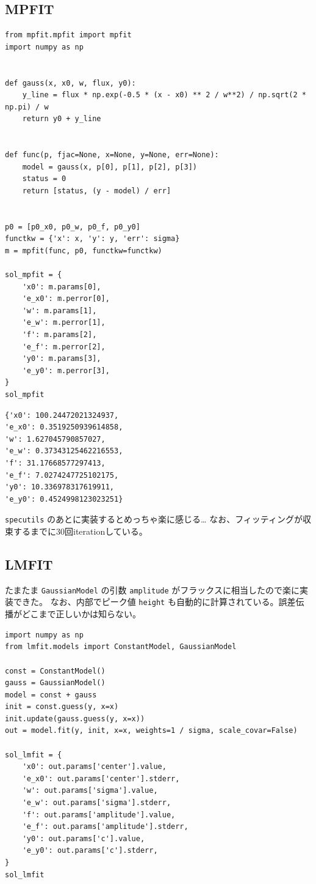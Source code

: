 \documentclass[a4paper, 9pt, notitlepage, uplatex, dvipdfmx]{jsarticle}
\begin{document}
\subsection{MPFIT}
\label{sec:org580a7e7}
\begin{verbatim}
from mpfit.mpfit import mpfit
import numpy as np


def gauss(x, x0, w, flux, y0):
    y_line = flux * np.exp(-0.5 * (x - x0) ** 2 / w**2) / np.sqrt(2 * np.pi) / w
    return y0 + y_line


def func(p, fjac=None, x=None, y=None, err=None):
    model = gauss(x, p[0], p[1], p[2], p[3])
    status = 0
    return [status, (y - model) / err]


p0 = [p0_x0, p0_w, p0_f, p0_y0]
functkw = {'x': x, 'y': y, 'err': sigma}
m = mpfit(func, p0, functkw=functkw)

sol_mpfit = {
    'x0': m.params[0],
    'e_x0': m.perror[0],
    'w': m.params[1],
    'e_w': m.perror[1],
    'f': m.params[2],
    'e_f': m.perror[2],
    'y0': m.params[3],
    'e_y0': m.perror[3],
}
sol_mpfit
\end{verbatim}

\label{}
\begin{verbatim}
{'x0': 100.24472021324937,
'e_x0': 0.3519250939614858,
'w': 1.627045790857027,
'e_w': 0.37343125462216553,
'f': 31.17668577297413,
'e_f': 7.0274247725102175,
'y0': 10.336978317619911,
'e_y0': 0.4524998123023251}
\end{verbatim}

\texttt{specutils} のあとに実装するとめっちゃ楽に感じる\ldots{}
なお、フィッティングが収束するまでに30回iterationしている。
\subsection{LMFIT}
\label{sec:org6658c17}
たまたま \texttt{GaussianModel} の引数 \texttt{amplitude} がフラックスに相当したので楽に実装できた。
なお、内部でピーク値 \texttt{height} も自動的に計算されている。誤差伝播がどこまで正しいかは知らない。

\begin{verbatim}
import numpy as np
from lmfit.models import ConstantModel, GaussianModel

const = ConstantModel()
gauss = GaussianModel()
model = const + gauss
init = const.guess(y, x=x)
init.update(gauss.guess(y, x=x))
out = model.fit(y, init, x=x, weights=1 / sigma, scale_covar=False)

sol_lmfit = {
    'x0': out.params['center'].value,
    'e_x0': out.params['center'].stderr,
    'w': out.params['sigma'].value,
    'e_w': out.params['sigma'].stderr,
    'f': out.params['amplitude'].value,
    'e_f': out.params['amplitude'].stderr,
    'y0': out.params['c'].value,
    'e_y0': out.params['c'].stderr,
}
sol_lmfit
\end{verbatim}
\end{document}
